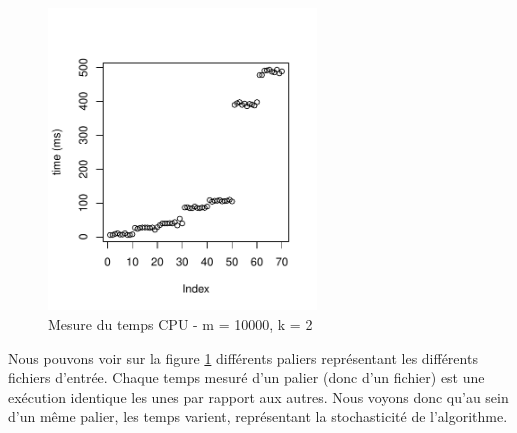 



\begin{figure}[H]
	\begin{center}
		\includegraphics[height=8cm]{diagrams/time_m_10000_k_2.pdf}
		\caption{Mesure du temps CPU - m = 10000, k = 2}
		\label{fig:timeM10000K2}
	\end{center}
\end{figure}
Nous pouvons voir sur la figure \ref{fig:timeM10000K2} différents paliers représentant les différents fichiers d'entrée.
Chaque temps mesuré d'un palier (donc d'un fichier) est une exécution identique les unes par rapport aux autres.
Nous voyons donc qu'au sein d'un même palier, les temps varient, représentant la stochasticité de l'algorithme.

